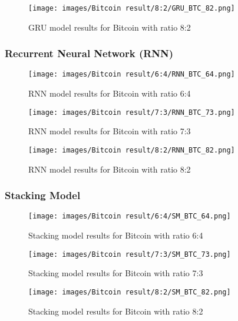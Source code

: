 \documentclass{ieeeojies}
\begin{document}
\begin{figure}[H]
  \centering
  \texttt{[image: images/Bitcoin result/8:2/GRU\_BTC\_82.png]}
  \caption{GRU model results for Bitcoin with ratio 8:2}
  \label{fig:gru_btc_82}
\end{figure}

\subsubsection{Recurrent Neural Network (RNN)}

\begin{figure}[H]
  \centering
  \texttt{[image: images/Bitcoin result/6:4/RNN\_BTC\_64.png]}
  \caption{RNN model results for Bitcoin with ratio 6:4}
  \label{fig:rnn_btc_64}
\end{figure}

\begin{figure}[H]
  \centering
  \texttt{[image: images/Bitcoin result/7:3/RNN\_BTC\_73.png]}
  \caption{RNN model results for Bitcoin with ratio 7:3}
  \label{fig:rnn_btc_73}
\end{figure}

\begin{figure}[H]
  \centering
  \texttt{[image: images/Bitcoin result/8:2/RNN\_BTC\_82.png]}
  \caption{RNN model results for Bitcoin with ratio 8:2}
  \label{fig:rnn_btc_82}
\end{figure}

\subsubsection{Stacking Model}

\begin{figure}[H]
  \centering
  \texttt{[image: images/Bitcoin result/6:4/SM\_BTC\_64.png]}
  \caption{Stacking model results for Bitcoin with ratio 6:4}
  \label{fig:sm_btc_64}
\end{figure}

\begin{figure}[H]
  \centering
  \texttt{[image: images/Bitcoin result/7:3/SM\_BTC\_73.png]}
  \caption{Stacking model results for Bitcoin with ratio 7:3}
  \label{fig:sm_btc_73}
\end{figure}

\begin{figure}[H]
  \centering
  \texttt{[image: images/Bitcoin result/8:2/SM\_BTC\_82.png]}
  \caption{Stacking model results for Bitcoin with ratio 8:2}
  \label{fig:sm_btc_82}
\end{figure}
\end{document}
